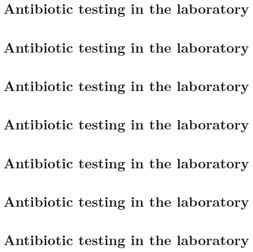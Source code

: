 \documentclass[
  letterpaper,
  DIV=11,
  numbers=noendperiod]{scrreprt}
\begin{document}

\hypertarget{antibiotic-testing-in-the-laboratory-9}{%
\chapter{Antibiotic testing in the
laboratory}\label{antibiotic-testing-in-the-laboratory-9}}


\hypertarget{antibiotic-testing-in-the-laboratory-10}{%
\chapter{Antibiotic testing in the
laboratory}\label{antibiotic-testing-in-the-laboratory-10}}


\hypertarget{antibiotic-testing-in-the-laboratory-11}{%
\chapter{Antibiotic testing in the
laboratory}\label{antibiotic-testing-in-the-laboratory-11}}


\hypertarget{antibiotic-testing-in-the-laboratory-12}{%
\chapter{Antibiotic testing in the
laboratory}\label{antibiotic-testing-in-the-laboratory-12}}


\hypertarget{antibiotic-testing-in-the-laboratory-13}{%
\chapter{Antibiotic testing in the
laboratory}\label{antibiotic-testing-in-the-laboratory-13}}


\hypertarget{antibiotic-testing-in-the-laboratory-14}{%
\chapter{Antibiotic testing in the
laboratory}\label{antibiotic-testing-in-the-laboratory-14}}


\hypertarget{antibiotic-testing-in-the-laboratory-15}{%
\chapter{Antibiotic testing in the
laboratory}\label{antibiotic-testing-in-the-laboratory-15}}
\end{document}

